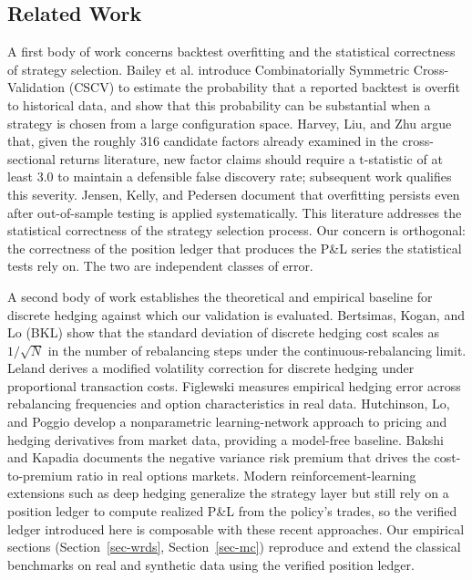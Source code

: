 \documentclass[
  11pt,
  letterpaper,
  DIV=12,
  numbers=noendperiod]{scrartcl}
\numberwithin{equation}{section}
\numberwithin{figure}{section}
\numberwithin{table}{section}
\begin{document}
\subsection{Related Work}\label{sec-related}

A first body of work concerns backtest overfitting and the statistical
correctness of strategy selection. Bailey et al.
 introduce Combinatorially
Symmetric Cross-Validation (CSCV) to estimate the probability that a
reported backtest is overfit to historical data, and show that this
probability can be substantial when a strategy is chosen from a large
configuration space. Harvey, Liu, and Zhu
 argue that, given the roughly 316
candidate factors already examined in the cross-sectional returns
literature, new factor claims should require a t-statistic of at least
3.0 to maintain a defensible false discovery rate; subsequent work
qualifies this severity. Jensen, Kelly, and Pedersen
 document that overfitting persists
even after out-of-sample testing is applied systematically. This
literature addresses the statistical correctness of the strategy
selection process. Our concern is orthogonal: the correctness of the
position ledger that produces the P\&L series the statistical tests rely
on. The two are independent classes of error.

A second body of work establishes the theoretical and empirical baseline
for discrete hedging against which our validation is evaluated.
Bertsimas, Kogan, and Lo  (BKL) show
that the standard deviation of discrete hedging cost scales as
\(1/\sqrt{N}\) in the number of rebalancing steps under the
continuous-rebalancing limit. Leland 
derives a modified volatility correction for discrete hedging under
proportional transaction costs. Figlewski
 measures empirical hedging error
across rebalancing frequencies and option characteristics in real data.
Hutchinson, Lo, and Poggio  develop
a nonparametric learning-network approach to pricing and hedging
derivatives from market data, providing a model-free baseline. Bakshi
and Kapadia  documents the
negative variance risk premium that drives the cost-to-premium ratio in
real options markets. Modern reinforcement-learning extensions such as
deep hedging 
generalize the strategy layer but still rely on a position ledger to
compute realized P\&L from the policy's trades, so the verified ledger
introduced here is composable with these recent approaches. Our
empirical sections (Section~\ref{sec-wrds}, Section~\ref{sec-mc})
reproduce and extend the classical benchmarks on real and synthetic data
using the verified position ledger.
\end{document}
